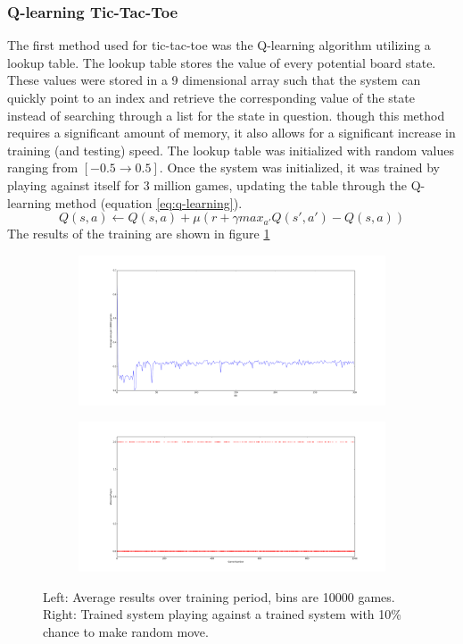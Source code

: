 \documentclass[12pt,a4paper]{article}
\begin{document}
\subsubsection*{Q-learning Tic-Tac-Toe}
The first method used for tic-tac-toe was the Q-learning algorithm utilizing a lookup table. The lookup table stores the value of every potential board state. These values were stored in a 9 dimensional array such that the system can quickly point to an index and retrieve the corresponding value of the state instead of searching through a list for the state in question. though this method requires a significant amount of memory, it also allows for a significant increase in training (and testing) speed. The lookup table was initialized with random values ranging from $[-0.5 \rightarrow 0.5]$. Once the system was initialized, it was trained by playing against itself for 3 million games, updating the table through the Q-learning method (equation \ref{eq:q-learning}). 
\begin{equation}
{Q(s,a)} \leftarrow {Q(s,a) + \mu(r + \gamma max_{a'}Q(s',a')-Q(s,a))}
\label{eq:q-learning}
\end{equation}
The results of the training are shown in figure \ref{fig:training}
\begin{figure}[h]
\centering
\begin{subfigure}[h]{0.45\textwidth}
\includegraphics[width=\textwidth]{Figures/train01epsilon.png}
\end{subfigure}
\begin{subfigure}[h]{0.45\textwidth}
\includegraphics[width=\textwidth]{Figures/Optimalstateresults.png}
\end{subfigure}
\caption{Left: Average results over training period, bins are 10000 games. Right: Trained system playing against a trained system with 10\% chance to make random move.}
\label{fig:training}
\end{figure}
\end{document}
